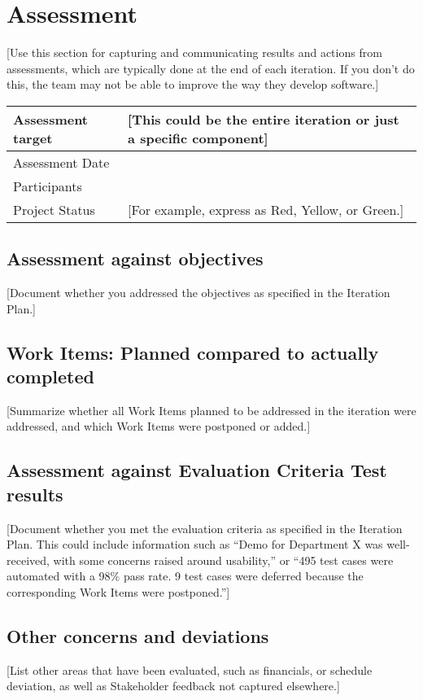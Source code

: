 \documentclass{article}%
\begin{document}
\section{Assessment}

[Use this section for capturing and communicating results and actions from assessments, which are typically done at the end of each iteration. If you don’t do this, the team may not be able to improve the way they develop software.]

\begin{tabular}{|l|l|}
\hline
Assessment target & [This could be the entire iteration or just a specific component]\\\hline
Assessment Date & \\\hline
Participants & \\\hline
Project Status & [For example, express as Red, Yellow, or Green.]\\\hline
\end{tabular}

\subsection{ Assessment against objectives}
[Document whether you addressed the objectives as specified in the Iteration Plan.]
\subsection{	Work Items: Planned compared to actually completed}
[Summarize whether all Work Items planned to be addressed in the iteration were addressed, and which Work Items were postponed or added.]
\subsection{Assessment against Evaluation Criteria Test results}
[Document whether you met the evaluation criteria as specified in the Iteration Plan. This could include information such as “Demo for Department X was well-received, with some concerns raised around usability,” or “495 test cases were automated with a 98\% pass rate. 9 test cases were deferred because the corresponding Work Items were postponed.”]
\subsection{	Other concerns and deviations}
[List other areas that have been evaluated, such as financials, or schedule deviation, as well as Stakeholder feedback not captured elsewhere.]
\end{document}
